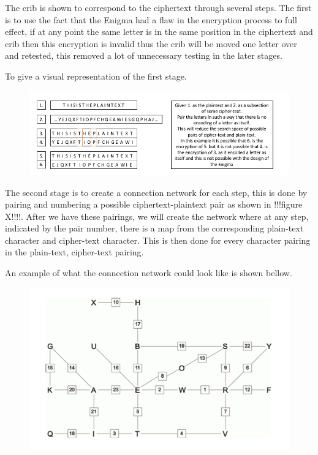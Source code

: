 \documentclass[12pt,a4paper]{article}
\begin{document}
The crib is shown to correspond to the ciphertext through several steps. The first is to use the fact that the Enigma had a flaw in the encryption process to full effect, if at any point the same letter is in the same position in the ciphertext and crib then this encryption is invalid thus the crib will be moved one letter over and retested, this removed a lot of unnecessary testing in the later stages. 

To give a visual representation of the first stage.

\begin{figure}[h]
\centering
\includegraphics[width=\textwidth]{StageOneBOMBE.png}
\end{figure}

The second stage is to create a connection network for each step, this is done by pairing and numbering a possible ciphertext-plaintext pair as shown in !!!figure X!!!!. After we have these pairings, we will create the network where at any step, indicated by the pair number, there is a map from the corresponding plain-text character and cipher-text character. This is then done for every character pairing in the plain-text, cipher-text pairing.

An example of what the connection network could look like is shown bellow.

\begin{figure}[h]
\centering
\includegraphics[width=\textwidth]{StageTwoBOMBE.png}
\end{figure}
\end{document}
